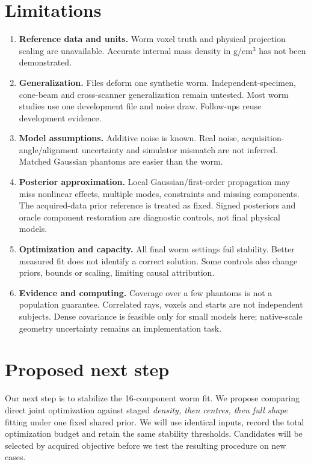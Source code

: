 \documentclass[11pt,a4paper]{article}
\begin{document}
\section{Limitations}
\begin{enumerate}
\item \textbf{Reference data and units.} Worm voxel truth and physical projection scaling are unavailable. Accurate internal mass density in g/cm$^3$ has not been demonstrated.
\item \textbf{Generalization.} Files deform one synthetic worm. Independent-specimen, cone-beam and cross-scanner generalization remain untested. Most worm studies use one development file and noise draw. Follow-ups reuse development evidence.
\item \textbf{Model assumptions.} Additive noise is known. Real noise, acquisition-angle/alignment uncertainty and simulator mismatch are not inferred. Matched Gaussian phantoms are easier than the worm.
\item \textbf{Posterior approximation.} Local Gaussian/first-order propagation may miss nonlinear effects, multiple modes, constraints and missing components. The acquired-data prior reference is treated as fixed. Signed posteriors and oracle component restoration are diagnostic controls, not final physical models.
\item \textbf{Optimization and capacity.} All final worm settings fail stability. Better measured fit does not identify a correct solution. Some controls also change priors, bounds or scaling, limiting causal attribution.
\item \textbf{Evidence and computing.} Coverage over a few phantoms is not a population guarantee. Correlated rays, voxels and starts are not independent subjects. Dense covariance is feasible only for small models here; native-scale geometry uncertainty remains an implementation task.
\end{enumerate}

\section{Proposed next step}
Our next step is to stabilize the 16-component worm fit. We propose comparing direct joint optimization against staged \emph{density, then centres, then full shape} fitting under one fixed shared prior. We will use identical inputs, record the total optimization budget and retain the same stability thresholds. Candidates will be selected by acquired objective before we test the resulting procedure on new cases.
\end{document}
